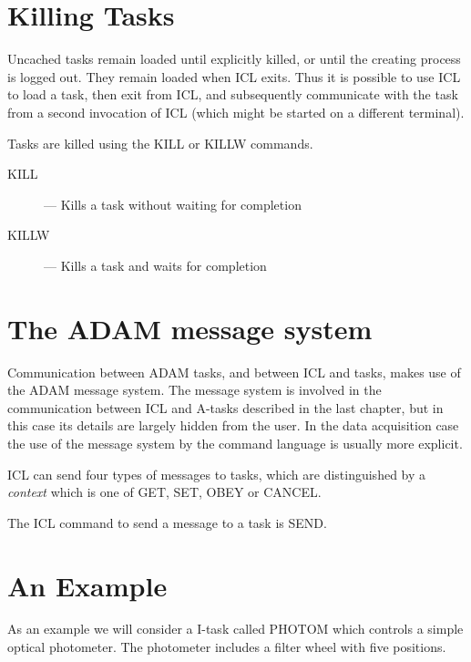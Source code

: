\documentclass[twoside,11pt]{report}
\newcommand{\xlabel}[1]{}
\begin{document}
\section{\xlabel{killing_tasks}Killing Tasks}

Uncached tasks remain loaded until explicitly killed, or until the creating
process is logged out. They remain loaded when ICL exits. Thus it is possible
to use ICL to load a task, then exit from ICL, and subsequently communicate
with the task from a second invocation of ICL (which might be started on
a different terminal).

Tasks are killed using the KILL or KILLW commands.

\begin{description}

\item[KILL] --- Kills a task without waiting for completion

\item[KILLW] --- Kills a task and waits for completion                    
                                                     
\end{description}

\section{\xlabel{the_adam_message_system}The ADAM message system}

Communication between ADAM tasks, and between ICL and tasks, makes use of
the ADAM message system. The message system is involved in the communication
between ICL and A-tasks described in the last chapter, but in this case
its details are largely hidden from the user. In the data acquisition case
the use of the message system by the command language is usually more explicit.

ICL can send four types of messages to tasks, which are distinguished by
a {\em context} which is one of GET, SET, OBEY or CANCEL. 

The ICL command to send a message to a task is SEND.

\section{\xlabel{an_example}An Example}

As an example we will consider a I-task called PHOTOM which controls a simple
optical photometer. The photometer includes a filter wheel with five positions.
\end{document}
